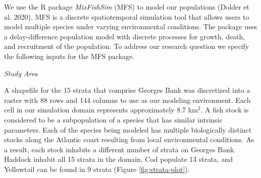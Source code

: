 \documentclass[
  12pt,
]{article}
\begin{document}
We use the R package \emph{MixFishSim} (MFS) to model our populations (Dolder et al. 2020). MFS is a discrete spatiotemporal simulation tool that allows users to model multiple species under varying environmental conditions. The package uses a delay-difference population model with discrete processes for growth, death, and recruitment of the population. To address our research question we specify the following inputs for the MFS package.

\emph{Study Area}

A shapefile for the 15 strata that comprise Georges Bank was discretized into a raster with 88 rows and 144 columns to use as our modeling environment. Each cell in our simulation domain represents approximately 8.7 km\(^2\). A fish stock is considered to be a subpopulation of a species that has similar intrinsic parameters. Each of the species being modeled has multiple biologically distinct stocks along the Atlantic coast resulting from local environmental conditions. As a result, each stock inhabits a different number of strata on Georges Bank. Haddock inhabit all 15 strata in the domain, Cod populate 13 strata, and Yellowtail can be found in 9 strata (Figure \ref{fig:strata-plot}).
\end{document}
